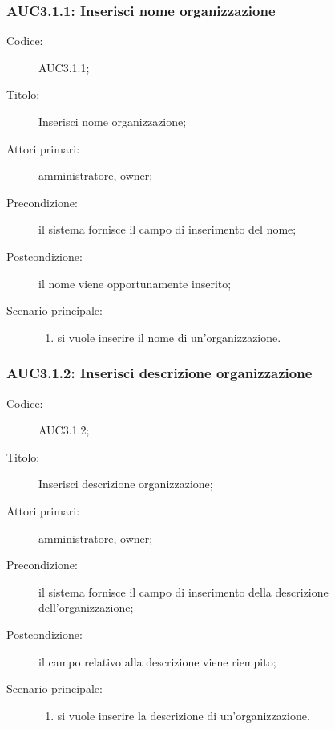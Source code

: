 \documentclass[../../../analisi-dei-requisiti.tex]{subfiles}
\begin{document}
\subsubsection{AUC3.1.1: Inserisci nome organizzazione}%
\label{subs:AUC3.1.1}
\begin{description}
  \item[Codice:] AUC3.1.1;
  \item[Titolo:] Inserisci nome organizzazione;
  \item[Attori primari:] amministratore, owner;
  \item[Precondizione:] il sistema fornisce il campo di inserimento del nome;
  \item[Postcondizione:] il nome viene opportunamente inserito;
  \item[Scenario principale:]
        \begin{enumerate}
          \item si vuole inserire il nome di un'organizzazione.
        \end{enumerate}

\end{description}

\subsubsection{AUC3.1.2: Inserisci descrizione organizzazione}%
\label{subs:AUC3.1.2}
\begin{description}
  \item[Codice:] AUC3.1.2;
  \item[Titolo:] Inserisci descrizione organizzazione;
  \item[Attori primari:] amministratore, owner;
  \item[Precondizione:] il sistema fornisce il campo di inserimento della descrizione dell'organizzazione;
  \item[Postcondizione:] il campo relativo alla descrizione viene riempito;
  \item[Scenario principale:]
        \begin{enumerate}
          \item si vuole inserire la descrizione di un'organizzazione.
        \end{enumerate}
\end{description}
\end{document}
